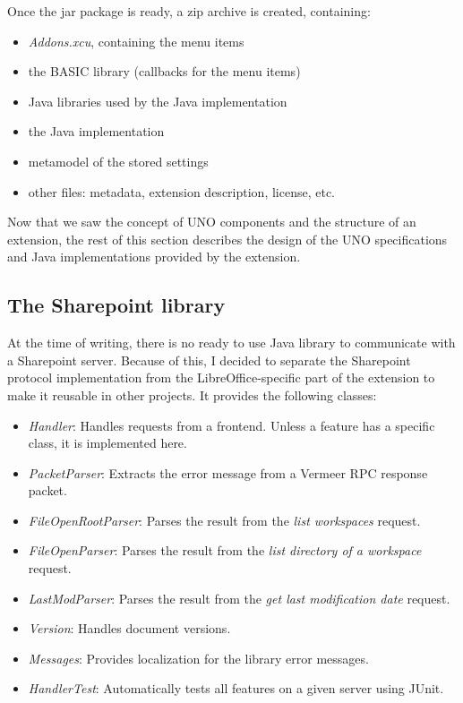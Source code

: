 Once the jar package is ready, a zip archive is created, containing:

\begin{itemize}
\item \emph{Addons.xcu}, containing the menu items
\item the BASIC library (callbacks for the menu items)
\item Java libraries used by the Java implementation
\item the Java implementation
\item metamodel of the stored settings
\item other files: metadata, extension description, license, etc.
\end{itemize}

Now that we saw the concept of UNO components and the structure of an
extension, the rest of this section describes the design of the UNO
specifications and Java implementations provided by the extension.

\subsection{The Sharepoint library}

At the time of writing, there is no ready to use Java library to communicate
with a Sharepoint server. Because of this, I decided to separate the Sharepoint
protocol implementation from the LibreOffice-specific part of the extension to
make it reusable in other projects. It provides the following classes:

\begin{itemize}
\item \emph{Handler}: Handles requests from a frontend. Unless a feature has a
specific class, it is implemented here.
\item \emph{PacketParser}: Extracts the error message from a Vermeer
RPC\cite{vermeer} response packet.
\item \emph{FileOpenRootParser}: Parses the result from the \emph{list
workspaces} request.
\item \emph{FileOpenParser}: Parses the result from the \emph{list directory of
a workspace} request.
\item \emph{LastModParser}: Parses the result from the \emph{get last
modification date} request.
\item \emph{Version}: Handles document versions.
\item \emph{Messages}: Provides localization for the library error messages.
\item \emph{HandlerTest}: Automatically tests all features on a given server
using JUnit.
\end{itemize}

